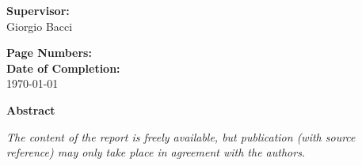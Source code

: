 \begin{singlespace}
\begin{minipage}[t]{0.48\textwidth}
    \textbf{Supervisor:} \\[5pt]\hspace*{2ex}
    Giorgio Bacci
    
    \vspace*{0.5cm}
    
    \textbf{Page Numbers:} \pageref{bib:mybiblio} \\
    
    \textbf{Date of Completion:} \\[5pt]\hspace*{2ex}
    \today
\end{minipage}
\hfill
\begin{minipage}[t]{0.483\textwidth}
    \textbf{Abstract} \\[5pt]
    \fbox{\parbox{7cm}{\bigskip\small{\bigskip}}}
\end{minipage}

\vfill

{\scriptsize\itshape The content of the report is freely available, but publication (with source reference) may only take place in agreement with the authors.}

\end{singlespace}